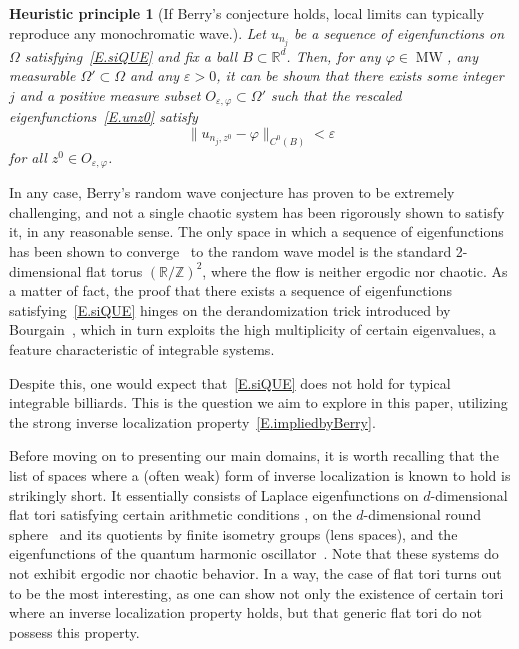 \documentclass{amsart}
\newtheorem*{principle}{Heuristic principle}
\theoremstyle{definition}
\theoremstyle{remark}
\newcommand{\ep}{\varepsilon}
\newcommand{\vp}{\varphi}
\newcommand{\Om}{\Omega}
\def\RR{\mathbb{R}}
\def\ZZ{\mathbb{Z}}
\numberwithin{equation}{section}
\theoremstyle{definition}
\theoremstyle{remark}
\def\RR{\mathbb{R}}
\DeclareMathOperator\MW{MW}
\def\ZZ{\mathbb{Z}}
\begin{document}
\begin{principle}
	[If Berry's conjecture holds, local limits can typically reproduce any monochromatic wave.] Let $u_{n_j}$ be a sequence of eigenfunctions on~$\Om$ satisfying~\eqref{E.siQUE} and fix a ball $B\subset\RR^d$. Then, for any $\vp\in \MW$, any measurable $\Om'\subset\Om$ and any $\ep>0$, it can be shown that there exists some integer~$j$ and a positive measure subset $O_{\ep,\vp}\subset\Om'$ such that the rescaled eigenfunctions~\eqref{E.unz0} satisfy
	\begin{equation}\label{E.impliedbyBerry}
	\|u_{n_j,z^0}-\vp\|_{C^0(B)}<\ep
\end{equation}
for all $z^0\in O_{\ep,\vp}$.
\end{principle}


In any case, Berry's random wave conjecture has proven to be extremely challenging, and not a single chaotic system has been rigorously shown to satisfy it, in any reasonable sense. The only space in which a sequence of eigenfunctions has been shown to converge~\cite{Ingremeau} to the random wave model is the standard 2-dimensional flat torus $(\RR/\ZZ)^2$, where the flow is neither ergodic nor chaotic. As a matter of fact, the proof that there exists a sequence  of eigenfunctions satisfying~\eqref{E.siQUE} hinges on the derandomization trick introduced by Bourgain~\cite{Bourgain}, which in turn exploits the high multiplicity of certain eigenvalues, a feature characteristic of integrable systems. 

Despite this, one would expect that~\eqref{E.siQUE} does not hold for typical  integrable billiards. This is the question we aim to explore in this paper, utilizing the strong inverse localization property~\eqref{E.impliedbyBerry}.

Before moving on to presenting our main domains, it is worth recalling that the list of spaces where a (often weak) form of inverse localization is known to hold is strikingly short. It essentially consists of Laplace eigenfunctions on $d$-dimensional flat tori satisfying certain arithmetic conditions \cite{ILtori}, on the $d$-dimensional round sphere~\cite{EPT21} and its quotients by finite isometry groups (lens spaces), and the eigenfunctions of the quantum harmonic oscillator~\cite{JEMS}. Note that these systems do not exhibit ergodic nor chaotic behavior. In a way, the case of flat tori \cite{ILtori} turns out to be the most interesting, as one can show not only the existence of certain tori where an inverse localization property holds, but that generic flat tori do not possess this property.
\end{document}

